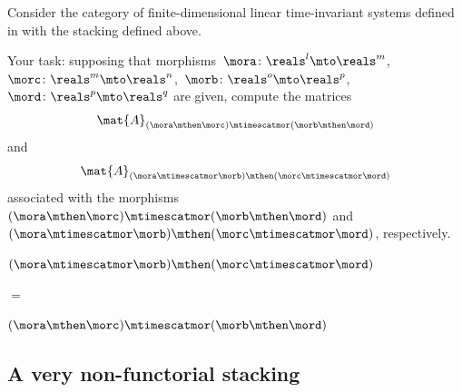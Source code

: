 \begin{gradedexercise}
    \label{ex:StackingLTI}

    Consider the category of finite-dimensional linear time-invariant systems defined in  with the stacking defined above.

    Your task:
    supposing that morphisms~$\mora\colon \reals^l\mto \reals^m$,~$\morc\colon \reals^m\mto \reals^n$,~$\morb\colon \reals^o\mto \reals^p$,~$\mord\colon \reals^p\mto \reals^q$ are given, compute the matrices
    \begin{equation}
        \mat{A}_{(\mora \mthen \morc)\mtimescatmor (\morb\mthen \mord)}
    \end{equation}
    and
    \begin{equation}
        \mat{A}_{(\mora\mtimescatmor \morb)\mthen (\morc\mtimescatmor \mord)}
    \end{equation}
    associated with the morphisms $(\mora \mthen \morc)\mtimescatmor (\morb\mthen \mord)$ and $(\mora\mtimescatmor \morb)\mthen (\morc\mtimescatmor \mord)$, respectively.
\end{gradedexercise}


\begin{marginfigure}
    \centering
    $(\mora \mtimescatmor \morb )
        \mthen (\morc \mtimescatmor \mord )$

    \vspace{3mm}

    $=$

    \vspace{3mm}
    \vspace{3mm}
    $(\mora \mthen \morc ) \mtimescatmor (\morb \mthen \mord )$

    \caption{Commutation of stacking and composition in a functorial stacking . }
\end{marginfigure}

%

\subsection{A very non-functorial stacking}

